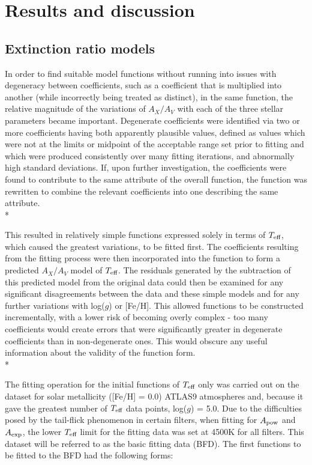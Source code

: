 \documentclass[12pt, a4paper]{report}
\begin{document}
\chapter{Results and discussion}
\section{Extinction ratio models} \label{ext_models}

In order to find suitable model functions without running into issues with degeneracy between coefficients, such as a coefficient that is multiplied into another (while incorrectly being treated as distinct), in the same function, the relative magnitude of the variations of $A_{X}/A_{V}$ with each of the three stellar parameters became important. Degenerate coefficients were identified via two or more coefficients having both apparently plausible values, defined as values which were not at the limits or midpoint of the acceptable range set prior to fitting and which were produced consistently over many fitting iterations, and abnormally high standard deviations. If, upon further investigation, the coefficients were found to contribute to the same attribute of the overall function, the function was rewritten to combine the relevant coefficients into one describing the same attribute.\\*

This resulted in relatively simple functions expressed solely in terms of $T_{\textnormal{eff}}$, which caused the greatest variations, to be fitted first. The coefficients resulting from the fitting process were then incorporated into the function to form a predicted $A_{X}/A_{V}$ model of $T_{\textnormal{eff}}$. The residuals generated by the subtraction of this predicted model from the original data could then be examined for any significant disagreements between the data and these simple models and for any further variations with log($g$) or [Fe/H]. This allowed functions to be constructed incrementally, with a lower risk of becoming overly complex - too many coefficients would create errors that were significantly greater in degenerate coefficients than in non-degenerate ones. This would obscure any useful information about the validity of the function form. \\*

The fitting operation for the initial functions of $T_{\textnormal{eff}}$ only was carried out on the dataset for solar metallicity ([Fe/H] = 0.0) ATLAS9 atmospheres and, because it gave the greatest number of $T_{\textnormal{eff}}$ data points, log($g$) = 5.0. Due to the difficulties posed by the tail-flick phenomenon in certain filters, when fitting for $A_{\textnormal{pow}}$ and $A_{\textnormal{exp}}$, the lower $T_{\textnormal{eff}}$ limit for the fitting data was set at 4500K for all filters. This dataset will be referred to as the basic fitting data (BFD). The first functions to be fitted to the BFD had the following forms:
\end{document}
